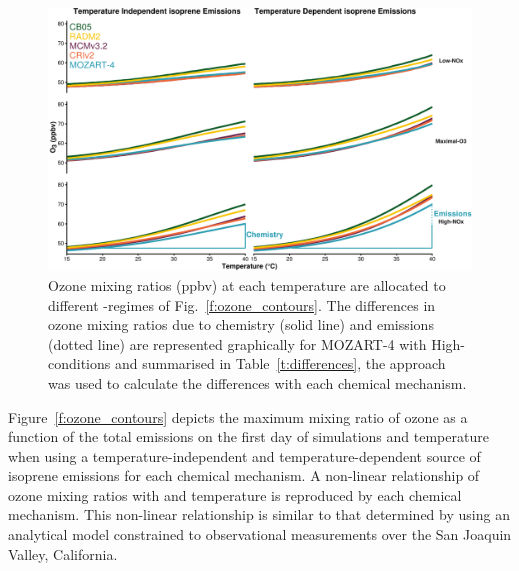 \begin{figure}[t]%
    \centering%
    \caption{Ozone mixing ratios (ppbv) at each temperature are allocated to different -regimes of Fig.~\ref{f:ozone_contours}. The differences in ozone mixing ratios due to chemistry (solid line) and emissions (dotted line) are represented graphically for MOZART-4 with High- conditions and summarised in Table~\ref{t:differences}, the approach was used to calculate the differences with each chemical mechanism.}%
    \label{f:O3-T}%
    \includegraphics[width=\textwidth]{img/O3-T_correlation}%
    \vspace{-4mm}
\end{figure}

\begin{table}%
    \centering%
    \caption{Increase in ozone mixing ratio (ppbv) due to chemistry and emissions at $40$~\degree C from reference temperature ($20$~\degree C) in the -regimes of Fig.~\ref{f:O3-T}.}%
    \label{t:differences}%
    \vspace{-4mm}
\end{table}

Figure~\ref{f:ozone_contours} depicts the maximum mixing ratio of ozone as a function of the total  emissions on the first day of simulations and temperature when using a temperature-independent and temperature-dependent source of isoprene emissions for each chemical mechanism.
A non-linear relationship of ozone mixing ratios with  and temperature is reproduced by each chemical mechanism.
This non-linear relationship is similar to that determined by \citet{Pusede:2014} using an analytical model constrained to observational measurements over the San Joaquin Valley, California.

